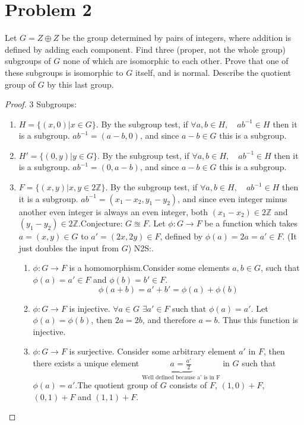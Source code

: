 \documentclass[hidelinks,12pt]{article}
\newcommand{\Z}{\mathbb{Z}}
\begin{document}
\section{Problem 2}Let $G=Z\oplus Z$ be the group determined by pairs of integers, where addition is defined by adding each component. Find three (proper, not the whole group) subgroups of $G$ none of which are isomorphic to each other. Prove that one of these subgroups is isomorphic to $G$ itself, and is normal. Describe the quotient group of $G$ by this last group.\begin{proof} 3 Subgroups:
\begin{enumerate}[label=(\arabic*)]
    \item $H=\{(x,0)|x\in G\}$. By the subgroup test, if $\forall a,b\in H,\quad ab^{-1}\in H$ then it is a subgroup. $ab^{-1}=(a-b,0)$, and since $a-b\in G$  this is a subgroup.
    \item $H'=\{(0,y)|y\in G\}$. By the subgroup test, if $\forall a,b\in H,\quad ab^{-1}\in H$ then it is a subgroup. $ab^{-1}=(0,a-b)$, and since $a-b\in G$  this is a subgroup.
    \item $F=\{(x,y)|x,y\in2\Z\}$. By the subgroup test, if $\forall a,b\in H,\quad ab^{-1}\in H$ then it is a subgroup. $ab^{-1}=(x_1-x_2,y_1-y_2)$, and since even integer minus another even integer is always an even integer, both $(x_1-x_2)\in 2\Z$ and $(y_1-y_2)\in 2\Z$.\newline Conjecture: $G\approxeq F$. Let $\phi:G\to F$ be a function which takes $a=(x,y)\in G$ to $a'=(2x,2y)\in F$, defined by $\phi(a)=2a=a'\in F$. (It just doubles the input from $G$) N2S:. \begin{enumerate}[label=\roman*]
        \item $\phi:G\to F$ is a homomorphism.\newline Consider some elements $a,b\in G$, such that $\phi(a)=a'\in F$ and $\phi(b)=b'\in F$. $$\phi(a+b)=a'+b'=\phi(a)+\phi(b)$$
        \item $\phi:G\to F$ is injective. \newline $\forall a\in G$ $\exists a'\in F$ such that $\phi(a)=a'$. Let $\phi(a)=\phi(b)$, then $2a=2b$, and therefore $a=b$. Thus this function is injective.
        \item $\phi:G\to F$ is surjective. \newline Consider some arbitrary element $a'$ in $F$, then there exists a unique element $\underbrace{a=\frac{a'}{2}}_{\text{Well defined because a' is in F}}$ in $G$ such that $\phi(a)=a'$.\newline The quotient group of $G$ consists of $F$, $(1,0)+F$, $(0,1)+F$ and $(1,1)+F$.
    \end{enumerate}
\end{enumerate}
\end{proof}
\end{document}
